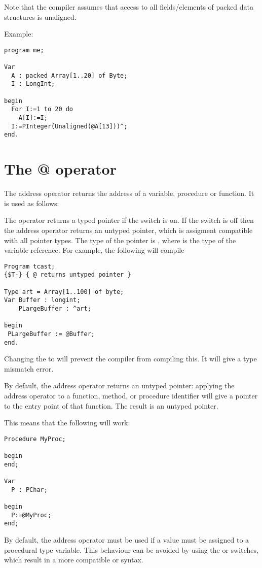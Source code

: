 Note that the compiler assumes that access to all fields/elements of
packed data structures is unaligned.

Example:
\begin{verbatim}
program me;

Var
  A : packed Array[1..20] of Byte;
  I : LongInt;

begin
  For I:=1 to 20 do
    A[I]:=I;
  I:=PInteger(Unaligned(@A[13]))^;
end.
\end{verbatim}

\section{The @ operator}
The address operator  returns the address of a variable, procedure
or function. It is used as follows:

The  operator returns a typed pointer if the  switch is on.
If the  switch is off then the address operator returns an untyped
pointer, which is assigment compatible with all pointer types. The type of
the pointer is , where  is the type of the variable
reference.
For example, the following will compile
\begin{verbatim}
Program tcast;
{$T-} { @ returns untyped pointer }

Type art = Array[1..100] of byte;
Var Buffer : longint;
    PLargeBuffer : ^art;

begin
 PLargeBuffer := @Buffer;
end.
\end{verbatim}
Changing the  to  will prevent the compiler from
compiling this. It will give a type mismatch error.

By default, the address operator returns an untyped pointer: applying 
the address operator to a function, method, or procedure identifier 
will give a pointer to the entry point of that function. 
The result is an untyped pointer.

This means that the following will work:
\begin{verbatim}
Procedure MyProc;

begin
end;

Var
  P : PChar;
 
begin
  P:=@MyProc;
end; 
\end{verbatim}
By default, the address operator must be used if a value must be assigned
to a procedural type variable. This behaviour can be avoided by using the
 or  switches, which result in a more compatible 
\delphi or \tp syntax.

